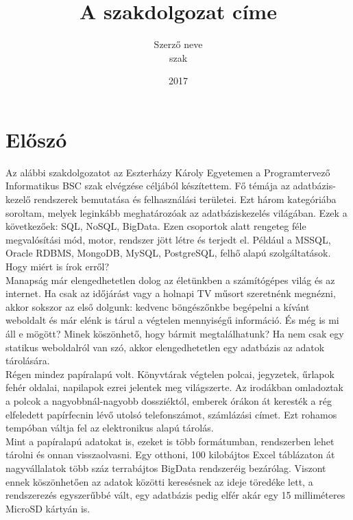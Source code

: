 \documentclass[colorlinks]{thesis-ekf}
\theoremstyle{definition}
\theoremstyle{remark}
\begin{document}
\title{A szakdolgozat címe}
\author{Szerző neve\\ szak}
\date{2017}
\maketitle
\tableofcontents

\chapter*{Előszó}
Az alábbi szakdolgozatot az Eszterházy Károly Egyetemen a Programtervező Informatikus BSC szak elvégzése céljából készítettem. Fő témája az adatbázis-kezelő rendszerek bemutatása és felhasználási területei. Ezt három kategóriába soroltam, melyek leginkább meghatározóak az adatbáziskezelés világában. Ezek a következőek: SQL, NoSQL, BigData. Ezen csoportok alatt rengeteg féle megvalósítási mód, motor, rendszer jött létre és terjedt el. Például a MSSQL, Oracle RDBMS, MongoDB, MySQL, PostgreSQL, felhő alapú szolgáltatások. Hogy miért is írok erről?\\
Manapság már elengedhetetlen dolog az életünkben a számítógépes világ és az internet. Ha csak az időjárást vagy a holnapi TV műsort szeretnénk megnézni, akkor sokszor az első dolgunk: kedvenc böngészőnkbe begépelni a kívánt weboldalt és már elénk is tárul a végtelen mennyiségű információ. És még is mi áll e mögött? Minek köszönhető, hogy bármit megtalálhatunk? Ha nem csak egy statikus weboldalról van szó, akkor elengedhetetlen egy adatbázis az adatok tárolására.\\
Régen mindez papíralapú volt. Könyvtárak végtelen polcai, jegyzetek, űrlapok fehér oldalai, napilapok ezrei jelentek meg világszerte. Az irodákban omladoztak a polcok a nagyobbnál-nagyobb dossziéktól, emberek órákon át keresték a rég elfeledett papírfecnin lévő utolsó telefonszámot, számlázási címet. Ezt rohamos tempóban váltja fel az elektronikus alapú tárolás.\\
Mint a papíralapú adatokat is, ezeket is több formátumban, rendszerben lehet tárolni és onnan visszaolvasni. Egy otthoni, 100 kilobájtos Excel táblázaton át nagyvállalatok több száz terrabájtos BigData rendszeréig bezárólag. Viszont ennek köszönhetően az adatok közötti keresésnek az ideje töredéke lett, a rendszerezés egyszerűbbé vált, egy adatbázis pedig elfér akár egy 15 milliméteres MicroSD kártyán is.\\
\end{document}
